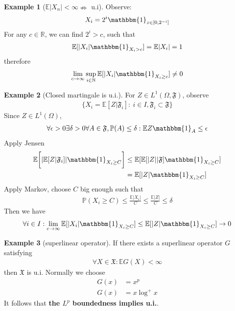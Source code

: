 \documentclass[a4paper,11pt]{book}
\theoremstyle{definition}
\newtheorem*{example}{Example}
\theoremstyle{remark}
\begin{document}
\begin{example}[$\mathbb{E}|X_n| < \infty \nRightarrow$ u.i]
Observe:
\begin{equation*}
 	X_i = 2^i \mathbbm{1}_{z \in [0, 2^{-i}]}
\end{equation*}
For any $c\in \mathbb{R}$, we can find $2^i >c$, such that
\begin{align*}
	\mathbb{E}[|X_i| \mathbbm{1}_{X_i > c}] = \mathbb{E}|X_i| = 1
\end{align*}
therefore
\begin{align*}
	\lim_{c \rightarrow \infty} \sup_{i\in \mathbb{N}} \mathbb{E}[|X_i| \mathbbm{1}_{X_i \ge c}] \ne 0
\end{align*}
\end{example}

\begin{example}[Closed martingale is u.i.]
For $Z \in L^1(\Omega, \mathfrak{F})$,  observe
\begin{align*}
	\bigg\{ X_i =  \mathbb{E}[Z|\mathfrak{F}_i]: \ i \in I, \mathfrak{F}_i \subset \mathfrak{F}\bigg\}
\end{align*} 
Since $Z\in L^1(\Omega)$, 
\begin{align*}
	\forall \epsilon > 0 \exists \delta >0 \forall A\in \mathfrak{F}, \mathbb{P}(A) \le \delta: \mathbb{E}Z\mathbbm{1}_{A} \le \epsilon
\end{align*}
Apply Jensen
\begin{align*}
	\mathbb{E}\bigg[ |\mathbb{E}[Z|\mathfrak{F}_i]| \mathbbm{1}_{X_i \ge C}\bigg]
	&\le \mathbb{E}[ \mathbb{E}[|Z||\mathfrak{F}] \mathbbm{1}_{X_i \ge C}]\\
	&= \mathbb{E}[|Z| \mathbbm{1}_{X_i \ge C}]
\end{align*}
Apply Markov, choose $C$ big enough such that
\begin{align*}
	\mathbb{P}(X_i \ge C) \le \frac{\mathbb{E}|X_i|}{C}\le \frac{\mathbb{E}|Z|}{C} \le \delta
\end{align*}
Then we have
\begin{align*}
	\forall i \in I: \lim_{c \rightarrow \infty} \mathbb{E}[|X_i| \mathbbm{1}_{X_i \ge C}] \le \mathbb{E}[|Z|\mathbbm{1}_{X_i \ge C}] \rightarrow   0
\end{align*}
\end{example}

\begin{example}[superlinear operator]
	If there exists a superlinear operator $G$ satisfying 
	\begin{align*}
		\forall X \in \mathfrak{X}: \mathbb{E}G(X) < \infty
	\end{align*}
	then $\mathfrak{X}$ is u.i. Normally we choose
	\begin{align*}
		G(x) &= x^p\\
		G(x) &= x \log^+ x
	\end{align*}
	It follows that \textbf{the $L^p$ boundedness implies u.i.}.
\end{example}
\end{document}
